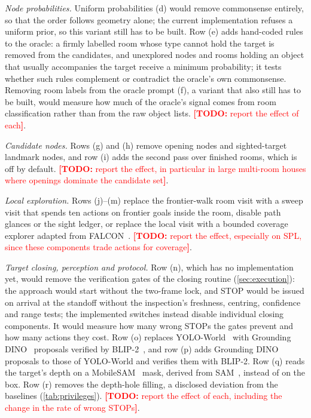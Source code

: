 \documentclass[10pt]{article}
\newcommand{\TODO}[1]{\textcolor{red}{\textbf{[TODO:} #1\textbf{]}}}
\newcommand{\SPL}{\textsc{SPL}\xspace}
\begin{document}
\emph{Node probabilities.} Uniform probabilities (d) would remove commonsense entirely, so that the order follows
geometry alone; the current implementation refuses a uniform prior, so this variant still has to be built. Row (e) adds hand-coded rules to the oracle: a firmly labelled room whose type cannot hold the target is
removed from the candidates, and unexplored nodes and rooms holding an object that usually accompanies the target
receive a minimum probability; it tests whether such rules complement or contradict the oracle's own commonsense.
Removing room labels from the oracle prompt (f), a variant that also still has to be built, would measure how much
of the oracle's signal comes from room classification rather than from the raw object lists. \TODO{report the effect of each}.

\emph{Candidate nodes.} Rows (g) and (h) remove opening nodes and sighted-target landmark nodes, and row (i) adds the
second pass over finished rooms, which is off by default. \TODO{report the effect, in particular in large multi-room houses where openings dominate the
candidate set}.

\emph{Local exploration.} Rows (j)--(m) replace the frontier-walk room visit with a sweep visit that spends ten actions on frontier
goals inside the room, disable path glances or the sight ledger, or replace the local visit with a bounded coverage
explorer adapted from FALCON~\citep{zhang2025falcon}. \TODO{report the effect, especially on \SPL, since these
components trade actions for coverage}.

\emph{Target closing, perception and protocol.} Row (n), which has no implementation yet, would remove the
verification gates of the closing routine (\cref{sec:execution}): the approach would start without the two-frame lock,
and STOP would be issued on arrival at the standoff without the inspection's freshness, centring, confidence and range
tests; the implemented switches instead disable individual closing components. It would measure how many wrong STOPs the gates
prevent and how many actions they cost. Row (o)
replaces YOLO-World~\citep{cheng2024yolo} with Grounding DINO~\citep{liu2024grounding} proposals verified by
BLIP-2~\citep{li2023blip}, and row (p) adds Grounding DINO proposals to those of YOLO-World and verifies them with
BLIP-2. Row (q) reads the target's depth on a MobileSAM~\citep{zhang2023faster} mask, derived from
SAM~\citep{kirillov2023segment}, instead of on the box. Row (r) removes the depth-hole filling, a disclosed deviation
from the baselines (\cref{tab:privileges}). \TODO{report the effect of each, including the change in the rate of wrong
STOPs}.
\end{document}
